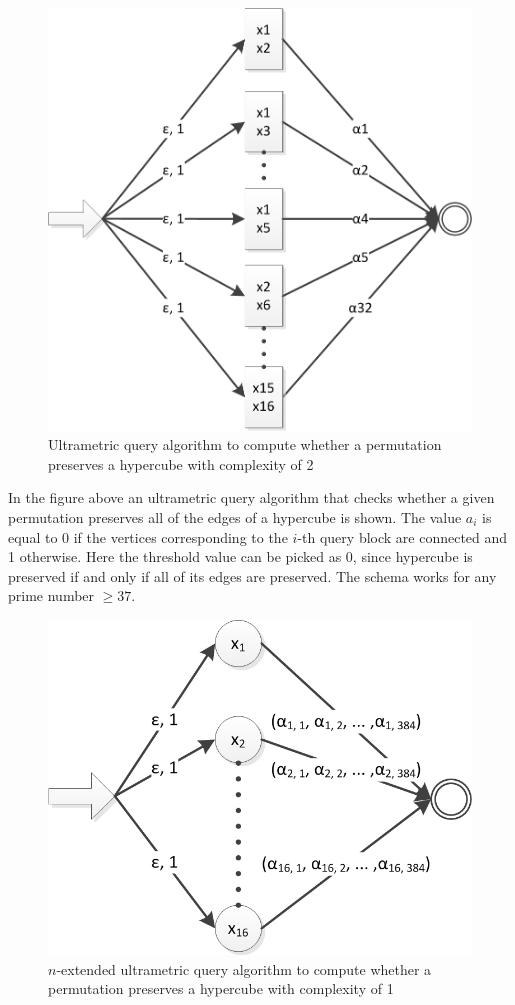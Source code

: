 \documentclass{llncs}
\begin{document}
\begin{figure}
	\centering
	\includegraphics{hypercube_2block.png}
	\caption{Ultrametric query algorithm to compute whether a permutation preserves a hypercube with complexity of 2}
	  \label{hyper2}
\end{figure}

In %
the figure above an ultrametric query algorithm that checks whether a given permutation preserves all of the edges of a hypercube is shown. The value $a_i$ is equal to 0 if the vertices corresponding to the $i$-th query block are connected and 1 otherwise. Here the threshold value can be picked as 0, since hypercube is preserved if and only if all of its edges are preserved. The schema works for any prime number $\geq 37$.

\begin{figure}
	\centering
	\includegraphics{hypercube_1block.png}
	\caption{$n$-extended ultrametric query algorithm to compute whether a permutation preserves a hypercube with complexity of 1}
	  \label{hyper1}
\end{figure}
\end{document}
